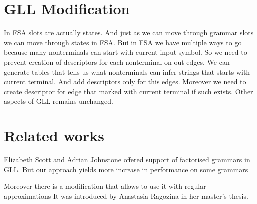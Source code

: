\documentclass[runningheads,a4paper]{llncs}
\begin{document}
\section{GLL Modification}
In FSA slots are actually states. And just as we can move through grammar slots we can move through states 
in FSA. But in FSA we have multiple ways to go because many nonterminals can start with current input symbol. 
So we need to prevent creation of descriptors for each nonterminal on out edges. We can generate tables that 
tells us what nonterminals can infer strings that starts with current terminal. And add descriptors only for 
this edges. Moreover we need to create descriptor for edge that marked with current terminal if such exists.
Other aspects of GLL remains unchanged.


\section{Related works}%

Elizabeth Scott and Adrian Johnstone offered support of factorised grammars in GLL\cite{scott2016structuring}. 
But our approach yields more increase in performance on some grammars

Moreover there is a modification that allows to use it with regular approximations It was introduced by 
Anastasia Ragozina in her master's thesis.





\end{document}
